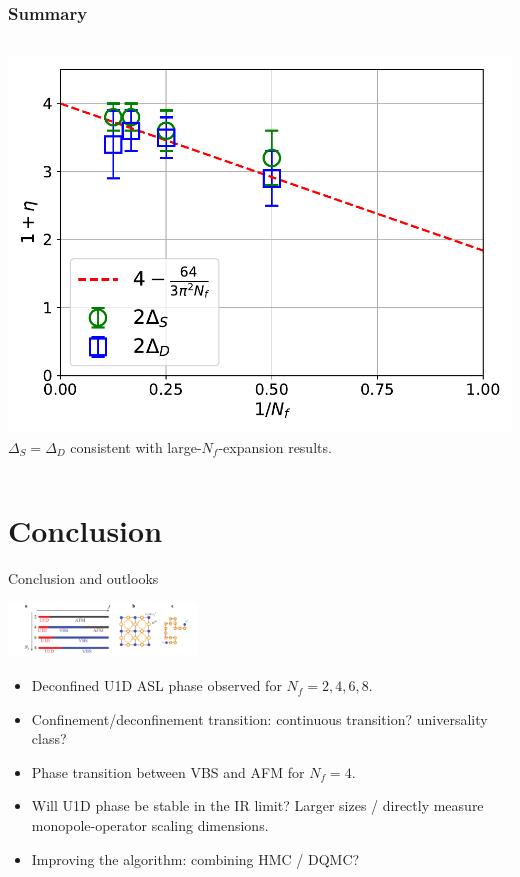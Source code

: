\documentclass[xcolor=table, 10pt, aspectratio=169]{beamer}
\begin{document}
\begin{frame}
  \frametitle{Summary}
  \begin{columns}
    \includegraphics[width=\textwidth]{eta}
		$\Delta_S=\Delta_D$ consistent with large-$N_f$-expansion results.
  \end{columns}
\end{frame}

\section{Conclusion}

\begin{frame}{Conclusion and outlooks}
  \begin{center}
    \includegraphics[width=5cm]{phase-diagram}
  \end{center}
  \begin{itemize}
    \item Deconfined U1D ASL phase observed for $N_f=2,4,6,8$.
    \item Confinement/deconfinement transition: continuous transition? universality class?
    \item Phase transition between VBS and AFM for $N_f=4$.
    \item Will U1D phase be stable in the IR limit? Larger sizes / directly measure monopole-operator scaling dimensions.
    \item Improving the algorithm: combining HMC / DQMC?
  \end{itemize}
\end{frame}
\end{document}
